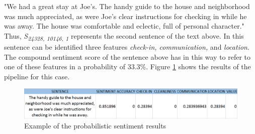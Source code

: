  "We had a great stay at Joe's. The handy guide to the house and neighborhood was much appreciated, as were Joe's clear instructions for checking in while he was away. The house was comfortable and eclectic, full of personal character." Thus, \textit{S\textsubscript{24328, 10146, 1}} represents the second sentence of the text above. In this sentence can be identified three features \textit{check-in, communication,} and \textit{location}. The compound sentiment score of the sentence above has in this way to refer to one of these features in a probability of 33.3\%. Figure \ref{fig:sent} shows the results of the pipeline for this case. 
\begin{figure}[h!]
	\centering
	\includegraphics[height=0.1\textheight]{example_pip}
	\caption{Example of the probabilistic sentiment results}
	\label{fig:sent}
\end{figure}

%

